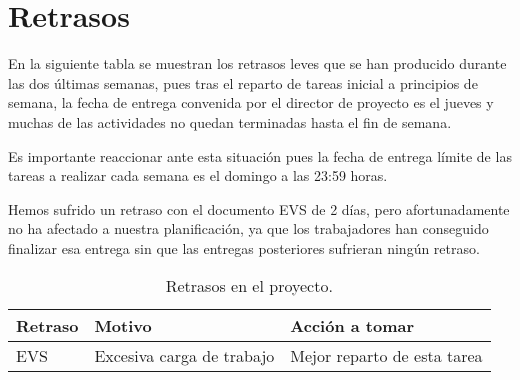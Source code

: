 \section{Retrasos}

\par En la siguiente tabla se muestran los retrasos leves que se han producido durante las dos últimas semanas, pues tras el reparto de tareas inicial a principios de semana, la fecha de entrega convenida por el director de proyecto es el jueves y muchas de las actividades no quedan terminadas hasta el fin de semana.
\par Es importante reaccionar ante esta situación pues la fecha de entrega límite de las tareas a realizar cada semana es el domingo a las 23:59 horas.
\par Hemos sufrido un retraso con el documento EVS de 2 días, pero afortunadamente no ha afectado a nuestra planificación, ya que los trabajadores han conseguido finalizar esa entrega sin que las entregas posteriores sufrieran ningún retraso.

\begin{table}[h]
\begin{center}
\begin{tabular}{ l l l }
\hline
	Retraso  & Motivo & Acción a tomar \\ \hline
	EVS & Excesiva carga de trabajo & Mejor reparto de esta tarea \\ \hline
\end{tabular}
\caption{Retrasos en el proyecto.}
\label{tab:Retrasos en el proyecto}
\end{center}
\end{table}

